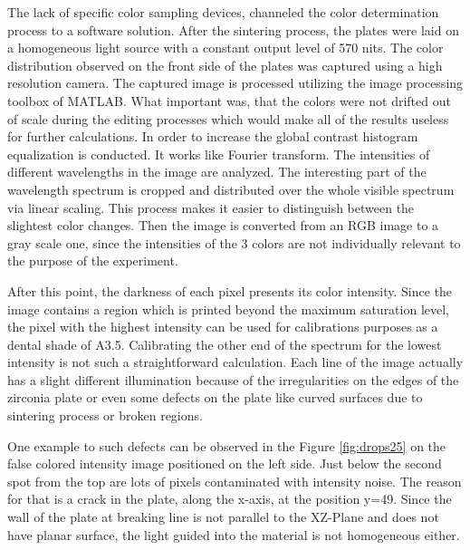 The lack of specific color sampling devices, channeled the color determination process to a software solution. After the sintering process, the plates were laid on a homogeneous light source with a constant output level of 570 nits. The color distribution observed on the front side of the plates was captured using a high resolution camera. The captured image is processed utilizing the image processing toolbox of MATLAB. What important was, that the colors were not drifted out of scale during the editing processes which would make all of the results useless for further calculations. In order to increase the global contrast histogram equalization is conducted. It works like Fourier transform. The intensities of different wavelengths in the image are analyzed. The interesting part of the wavelength spectrum is cropped and distributed over the whole visible spectrum via linear scaling. This process makes it easier to distinguish between the slightest color changes. Then the image is converted from an RGB image to a gray scale one, since the intensities of the 3 colors are not individually relevant to the purpose of the experiment. 

After this point, the darkness of each pixel presents its color intensity. Since the image contains a region which is printed beyond the maximum saturation level, the pixel with the highest intensity can be used for calibrations purposes as a dental shade of A3.5. Calibrating the other end of the spectrum for the lowest intensity is not such a straightforward calculation. Each line of the image actually has a slight different illumination because of the irregularities on the edges of the zirconia plate or even some defects on the  plate like curved surfaces due to sintering process or broken regions.

One example to such defects can be observed in the Figure \ref{fig:drops25} on the false colored intensity image positioned on the left side. Just below the second spot from the top are lots of pixels contaminated with intensity noise. The reason for that is a crack in the plate, along the x-axis, at the position y=49. Since the wall of the plate at breaking line is not parallel to the XZ-Plane and does not have planar surface, the light guided into the material is not homogeneous either. 
\bigskip

